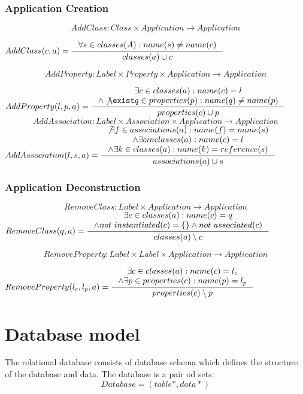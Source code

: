 \documentclass[11pt]{article}
\begin{document}
\subsubsection{Application Creation}
$$AddClass: Class \times Application \rightarrow Application $$

$
AddClass(c, a) = \inference{\forall s \in classes(A) : name(s) \neq name(c)}
{classes(a) \cup c}
$

$$AddProperty : Label \times Property \times Application \rightarrow Application $$

$
AddProperty(l, p, a) = \inference{\exists c \in classes(a) : name(c) = l \\ \wedge \not \exist q \in properties(p) : name(q) \neq name(p)}{
 properties(c) \cup p }
$
$$AddAssociation : Label \times Association \times Application \rightarrow Application $$
$
AddAssociation(l, s, a) = \inference{\not \exists f \in associations(a) : name(f) = name(s) \\ \wedge \exists c in classes(a) : name(c) = l \\ \wedge \exists k \in classes(a) : name(k) = reference(s) }{associations(a) \cup s}
$

\subsubsection{Application Deconstruction}
$$RemoveClass: Label \times Application \rightarrow Application $$
$
RemoveClass(q, a) = \inference{\exists c \in classes(a) : name(c) = q \\
\wedge not$ $instantiated(c) = \{ \} \wedge not$ $associated(c)}{classes(a) \setminus c }
$

$$RemoveProperty: Label \times Label \times Application \rightarrow Application $$

$
RemoveProperty(l_c, l_p, a) = \inference{\exists c \in classes(a) : name(c) = l_c \\ \wedge \exists p \in properties(c) : name(p) = l_p}{properties(c) \setminus p }
$


\section{Database model}
The relational database consists of database schema which defines the structure of the database and data. The database is a pair od sets:
$$
Database = (table*, data*)
$$
\end{document}
